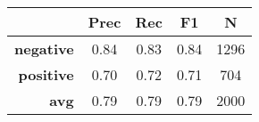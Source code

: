 \begin{tabular}{|r|c|c|c|c|}
\hline
 & {\bf Prec} & {\bf Rec} & {\bf F1} & {\bf N}\\
\hline
{\bf negative} & 0.84 & 0.83 & 0.84 & 1296\\
{\bf positive} & 0.70 & 0.72 & 0.71 & 704\\
\hline
{\bf avg} & 0.79 & 0.79 & 0.79 & 2000\\
\hline
\end{tabular}